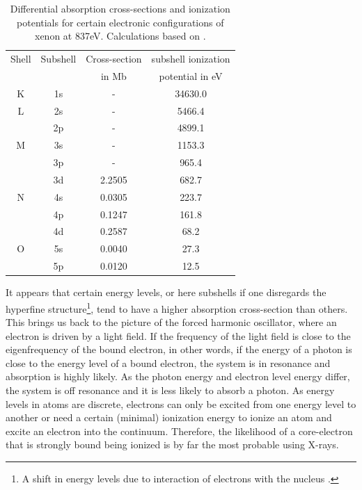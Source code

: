 \begin{table}
	\centering
		\begin{tabular}{ | c | c | c | c | }
			\hline
			Shell & Subshell & Cross-section & subshell ionization \\
				&	& in Mb & potential in eV \\ \hline
			K & 1s & - & 34630.0 \\ \hline
			L & 2s & - & 5466.4  \\ 
			\ & 2p & - & 4899.1 \\ \hline
			M & 3s & - & 1153.3  \\ 
			\ & 3p & - & 965.4 \\ 
			\ & 3d & 2.2505 & 682.7 \\ \hline
			N & 4s & 0.0305 & 223.7 \\ 
			\ & 4p & 0.1247 & 161.8 \\ 
			\ & 4d & 0.2587 & 68.2  \\ \hline
			O & 5s & 0.0040 & 27.3  \\ 
			\ & 5p & 0.0120 & 12.5  \\ \hline
		\end{tabular}
	\caption[Differential absorption cross-sections and ionization potentials for xenon.]{Differential absorption cross-sections and ionization potentials for certain electronic configurations of xenon at 837eV. Calculations based on \citep{Cowan-1981-Cal}.}
	\label{tab:xenon-photoionization-cross-section}
\end{table}
It appears that certain energy levels, or here subshells if one disregards the hyperfine structure\footnote{A shift in energy levels due to interaction of electrons with the nucleus \citep[see][p~166~ff.]{Demtroder-2005-Springer}.}, tend to have a higher absorption cross-section than others. This brings us back to the picture of the forced harmonic oscillator, where an electron is driven by a light field. If the frequency of the light field is close to the eigenfrequency of the bound electron, in other words, if the energy of a photon is close to the energy level of a bound electron, the system is in resonance and absorption is highly likely. As the photon energy and electron level energy differ, the system is off resonance and it is less likely to absorb a photon. As energy levels in atoms are discrete, electrons can only be excited from one energy level to another or need a certain (minimal) ionization energy to ionize an atom and excite an electron into the continuum. Therefore, the likelihood of a core-electron that is strongly bound being ionized is by far the most probable using X-rays.
